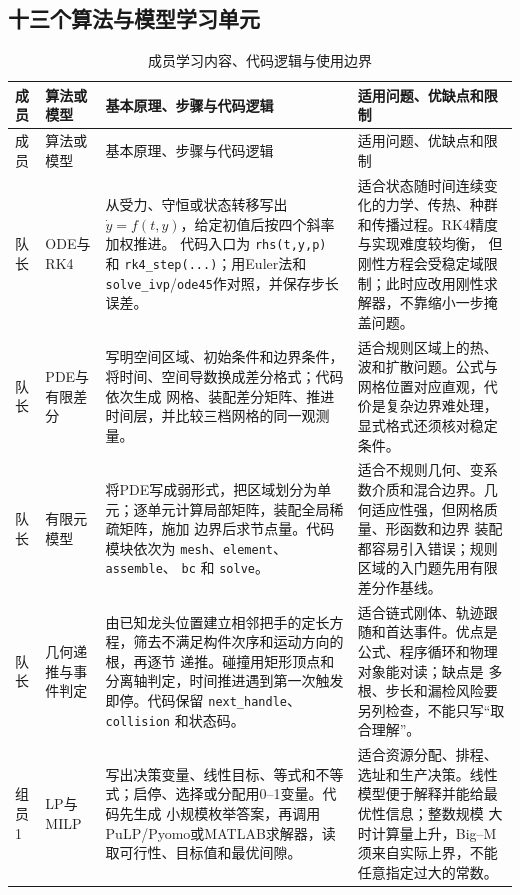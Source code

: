 \subsection{十三个算法与模型学习单元}

\setlength{\tabcolsep}{2.5pt}
\small
\begin{longtable}{p{1.25cm}p{2.55cm}p{6.25cm}p{5.45cm}}
\caption{成员学习内容、代码逻辑与使用边界}\label{tab:learning-units}\\
\toprule
成员 & 算法或模型 & 基本原理、步骤与代码逻辑 & 适用问题、优缺点和限制\\
\midrule
\endfirsthead
\toprule
成员 & 算法或模型 & 基本原理、步骤与代码逻辑 & 适用问题、优缺点和限制\\
\midrule
\endhead
\bottomrule
\endfoot

队长 & ODE与RK4
& 从受力、守恒或状态转移写出 $\dot{y}=f(t,y)$，给定初值后按四个斜率加权推进。
代码入口为 \texttt{rhs(t,y,p)} 和 \texttt{rk4\_step(...)}；用Euler法和
\texttt{solve\_ivp}/\texttt{ode45}作对照，并保存步长误差。
& 适合状态随时间连续变化的力学、传热、种群和传播过程。RK4精度与实现难度较均衡，
但刚性方程会受稳定域限制；此时应改用刚性求解器，不靠缩小一步掩盖问题。\\

队长 & PDE与有限差分
& 写明空间区域、初始条件和边界条件，将时间、空间导数换成差分格式；代码依次生成
网格、装配差分矩阵、推进时间层，并比较三档网格的同一观测量。
& 适合规则区域上的热、波和扩散问题。公式与网格位置对应直观，代价是复杂边界难处理，
显式格式还须核对稳定条件。\\

队长 & 有限元模型
& 将PDE写成弱形式，把区域划分为单元；逐单元计算局部矩阵，装配全局稀疏矩阵，施加
边界后求节点量。代码模块依次为 \texttt{mesh}、\texttt{element}、\texttt{assemble}、
\texttt{bc} 和 \texttt{solve}。
& 适合不规则几何、变系数介质和混合边界。几何适应性强，但网格质量、形函数和边界
装配都容易引入错误；规则区域的入门题先用有限差分作基线。\\

队长 & 几何递推与事件判定
& 由已知龙头位置建立相邻把手的定长方程，筛去不满足构件次序和运动方向的根，再逐节
递推。碰撞用矩形顶点和分离轴判定，时间推进遇到第一次触发即停。代码保留
\texttt{next\_handle}、\texttt{collision} 和状态码。
& 适合链式刚体、轨迹跟随和首达事件。优点是公式、程序循环和物理对象能对读；缺点是
多根、步长和漏检风险要另列检查，不能只写“取合理解”。\\

组员1 & LP与MILP
& 写出决策变量、线性目标、等式和不等式；启停、选择或分配用0--1变量。代码先生成
小规模枚举答案，再调用PuLP/Pyomo或MATLAB求解器，读取可行性、目标值和最优间隙。
& 适合资源分配、排程、选址和生产决策。线性模型便于解释并能给最优性信息；整数规模
大时计算量上升，Big--M须来自实际上界，不能任意指定过大的常数。\\


\end{longtable}
